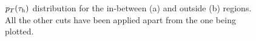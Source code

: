 \begin{figure}[H]
	\centering
	\hfill
	\caption{$p_T(\tau_\text{h})$ distribution for the in-between (a) and outside (b) regions. All the other cuts have been applied apart from the one being plotted.}
	\label{Fig12}
\end{figure} 
